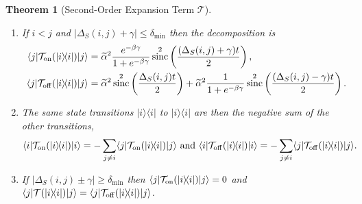 \documentclass{article}
\newtheorem{theorem}{Theorem}
\newcommand{\on}{\rm on}
\newcommand{\off}{\rm off}
\newcommand{\ket}[1]{|#1\rangle}
\newcommand{\bra}[1]{\langle #1|}
\newcommand{\ketbra}[2]{| #1\rangle\! \langle #2|}
\DeclareMathOperator{\sinc}{sinc}
\begin{document}
\begin{theorem}[Second-Order Expansion Term $\mathcal{T}$]
\begin{enumerate}
\begin{align}
    \bra{j}\mathcal{T}_{\off}(\ketbra{i}{i})\ket{j} &= \widetilde{\alpha}^2 \sinc^2 \left( \frac{\Delta_S(i,j)t}{2} \right) + \widetilde{\alpha}^2 \frac{e^{-\beta \gamma}}{1 + e^{-\beta \gamma}} \sinc^2 \left( \frac{(\Delta_S(i,j) + \gamma)t}{2} \right).
\end{align}
\item If $i < j$ and $|\Delta_S(i,j) + \gamma| \le \delta_{\min}$ then the decomposition is
\begin{align}
    \bra{j}\mathcal{T}_{\on}(\ketbra{i}{i})\ket{j} &=  \widetilde{\alpha}^2 \frac{e^{-\beta \gamma}}{1 + e^{-\beta \gamma}} \sinc^2 \left( \frac{(\Delta_S(i,j) + \gamma)t}{2} \right), \\
    \bra{j}\mathcal{T}_{\off}(\ketbra{i}{i})\ket{j} &= \widetilde{\alpha}^2 \sinc^2 \left( \frac{\Delta_S(i,j)t}{2} \right) + \widetilde{\alpha}^2 \frac{1}{1 + e^{-\beta \gamma}} \sinc^2\left( \frac{(\Delta_S(i,j) - \gamma)t}{2} \right).
\end{align}
\item The same state transitions $\ketbra{i}{i}$ to $\ketbra{i}{i}$ are then the negative sum of the other transitions,
\begin{equation}
    \bra{i} \mathcal{T}_{\on}(\ketbra{i}{i}) \ket{i} = - \sum_{j \neq i} \bra{j} \mathcal{T}_{\on}(\ketbra{i}{i}) \ket{j} \text{ and } \bra{i} \mathcal{T}_{\off}(\ketbra{i}{i}) \ket{i} = - \sum_{j \neq i} \bra{j} \mathcal{T}_{\off}(\ketbra{i}{i}) \ket{j}.
\end{equation} 
\item If $|\Delta_S(i, j) \pm \gamma| \geq \delta_{\min}$ then $\bra{j}\mathcal{T}_{\on}(\ketbra{i}{i}) \ket{j} = 0$ and $\bra{j}\mathcal{T}(\ketbra{i}{i})\ket{j} = \bra{j}\mathcal{T}_{\off}(\ketbra{i}{i})\ket{j}$.
\end{enumerate}
\end{theorem}
\end{document}
